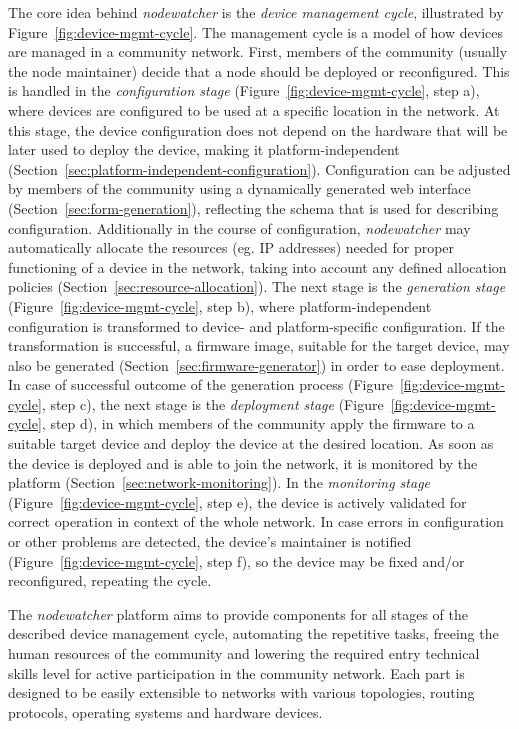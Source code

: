 \documentclass[5p,sort&compress]{elsarticle}
\newcommand{\nodewatcher}{\textit{nodewatcher}}
\begin{document}
The core idea behind \nodewatcher{} is the \textit{device management cycle}, illustrated by Figure~\ref{fig:device-mgmt-cycle}.
The management cycle is a model of how devices are managed in a community network.
First, members of the community (usually the node maintainer) decide that a node should be deployed or reconfigured.
This is handled in the \textit{configuration stage} (Figure~\ref{fig:device-mgmt-cycle}, step a), where devices are configured to be used at a specific location in the network.
At this stage, the device configuration does not depend on the hardware that will be later used to deploy the device, making it platform-independent (Section~\ref{sec:platform-independent-configuration}).
Configuration can be adjusted by members of the community using a dynamically generated web interface (Section~\ref{sec:form-generation}), reflecting the schema that is used for describing configuration.
Additionally in the course of configuration, \nodewatcher{} may automatically allocate the resources (eg. IP addresses) needed for proper functioning of a device in the network, taking into account any defined allocation policies (Section~\ref{sec:resource-allocation}).
The next stage is the \textit{generation stage} (Figure~\ref{fig:device-mgmt-cycle}, step b), where platform-independent configuration is transformed to device- and platform-specific configuration. 
If the transformation is successful, a firmware image, suitable for the target device, may also be generated (Section~\ref{sec:firmware-generator}) in order to ease deployment.
In case of successful outcome of the generation process (Figure~\ref{fig:device-mgmt-cycle}, step c), the next stage is the \textit{deployment stage} (Figure~\ref{fig:device-mgmt-cycle}, step d), in which members of the community apply the firmware to a suitable target device and deploy the device at the desired location.
As soon as the device is deployed and is able to join the network, it is monitored by the platform (Section~\ref{sec:network-monitoring}).
In the \textit{monitoring stage} (Figure~\ref{fig:device-mgmt-cycle}, step e), the device is actively validated for correct operation in context of the whole network.
In case errors in configuration or other problems are detected, the device's maintainer is notified (Figure~\ref{fig:device-mgmt-cycle}, step f), so the device may be fixed and/or reconfigured, repeating the cycle.

The \nodewatcher{} platform aims to provide components for all stages of the described device management cycle, automating the repetitive tasks, freeing the human resources of the community and lowering the required entry technical skills level for active participation in the community network.  
Each part is designed to be easily extensible to networks with various topologies, routing protocols, operating systems and hardware devices.
\end{document}
